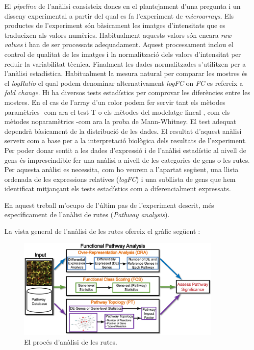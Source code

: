 El \textit{pipeline} de l'anàlisi consisteix doncs en el plantejament d'una pregunta i un disseny experimental a partir del qual es fa l'experiment de \textit{microarrays}. Els productes de l'experiment són bàsicament les imatges d'intensitats que es tradueixen als valors numèrics. Habitualment aquests valors són encara \textit{raw values} i han de ser processats adequadament. Aquest processament inclou el control de qualitat de les imatges i la normalització dels valors d'intensitat per reduir la variabilitat tècnica. Finalment les dades normalitzades s'utilitzen per a l'anàlisi estadística. Habitualment la mesura natural per comparar les mostres és el \textit{logRatio} el qual podem denominar alternativament \textit{\gls{logFC}} on \textit{FC} es refereix a \textit{fold change}. Hi ha diversos tests estadístics per comprovar les diferències entre les mostres. En el cas de l'array d'un color podem fer servir tant els mètodes paramètrics -com ara el test T o els mètodes del modelatge lineal-, com els mètodes noparamètrics -com ara la proba de Mann-Whitney. El test adequat dependrà bàsicament de la distribució de les dades. El resultat d'aquest anàlisi serveix com a base per a la interpretació biològica dels resultats de l'experiment. Per poder donar sentit a les dades d'expressió i de l'anàlisi estadístic al nivell de gens és imprescindible fer una anàlisi a nivell de les categories de gens o les rutes. Per aquesta anàlisi es necessita, com ho veurem a l'apartat següent, una llista ordenada de les expressions relatives (\textit{\gls{logFC}}) i una subllista de gens que hem identificat mitjançant els tests estadístics com a diferencialment expressats.

En aquest treball m'ocupo de l'últim pas de l'experiment descrit, més específicament de l'anàlisi de rutes (\textit{Pathway analysis}).

La vista general de l'anàlisi de les rutes ofereix el gràfic següent \cite{khatri2012ten}:

\begin{figure}[H]
\centering
\includegraphics[width=0.9\textwidth]{figures/Pipeline_Pathway.png} 
\caption{El procés d'anàlisi de les rutes.}
\end{figure}

